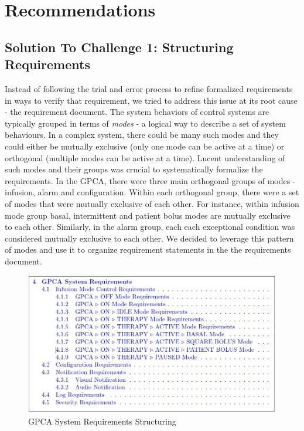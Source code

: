 \section{Recommendations}

\subsection {Solution To Challenge 1: Structuring Requirements}

Instead of following the trial and error process to refine formalized requirements in ways to verify that requirement, we tried to address this issue at its root cause - the requirement document. The system behaviors of control systems are typically grouped in terms of \emph{modes} - a logical way to describe a set of system behaviours. In a complex system, there could be many such modes and they could either be mutually exclusive (only one mode can be active at a time) or orthogonal (multiple modes can be active at a time). Lucent understanding of such modes and their groups was crucial to systematically formalize the requirements. In the GPCA, there were three main orthogonal groups of modes - infusion, alarm and configuration. Within each orthogonal group, there were a set of modes that were mutually exclusive of each other. For instance, within infusion mode group basal, intermittent and patient bolus modes are mutually exclusive to each other. Similarly, in the alarm group, each each exceptional condition was considered mutually exclusive to each other. We decided to leverage this pattern of modes and use it to organize requirement statements in the the requirements document.

 \begin{figure}[h!]
    \centering
    \includegraphics[width=\columnwidth]{images/structuring.jpg}
    \caption{GPCA System Requirements Structuring}
    \label{fig:gpca-requirements}
 \end{figure}

